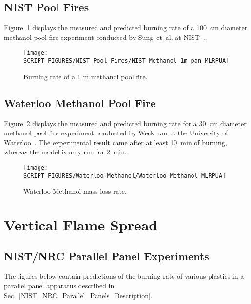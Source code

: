 \FloatBarrier

\subsection{NIST Pool Fires}

Figure~\ref{NIST_1_m_methanol_MLRPUA} displays the measured and predicted burning rate of a 100~cm diameter methanol pool fire experiment conducted by Sung~et~al. at NIST~\cite{Sung:TN2019}.

\begin{figure}[!ht]
\centering
\texttt{[image: SCRIPT\_FIGURES/NIST\_Pool\_Fires/NIST\_Methanol\_1m\_pan\_MLRPUA]}
\caption[NIST 1 m methanol burning rate]{Burning rate of a 1 m methanol pool fire.}
\label{NIST_1_m_methanol_MLRPUA}
\end{figure}

\FloatBarrier

\subsection{Waterloo Methanol Pool Fire}

Figure~\ref{Waterloo_HRR} displays the measured and predicted burning rate for a 30~cm diameter methanol pool fire experiment conducted by Weckman at the University of Waterloo~\cite{Weckman:CF1996}. The experimental result came after at least 10~min of burning, whereas the model is only run for 2~min.

\begin{figure}[!ht]
\centering
\texttt{[image: SCRIPT\_FIGURES/Waterloo\_Methanol/Waterloo\_Methanol\_MLRPUA]}
\caption[Waterloo Methanol mass loss rate]{Waterloo Methanol mass loss rate.}
\label{Waterloo_HRR}
\end{figure}



\clearpage

\section{Vertical Flame Spread}

\subsection{NIST/NRC Parallel Panel Experiments}

The figures below contain predictions of the burning rate of various plastics in a parallel panel apparatus described in Sec.~\ref{NIST_NRC_Parallel_Panels_Description}.

